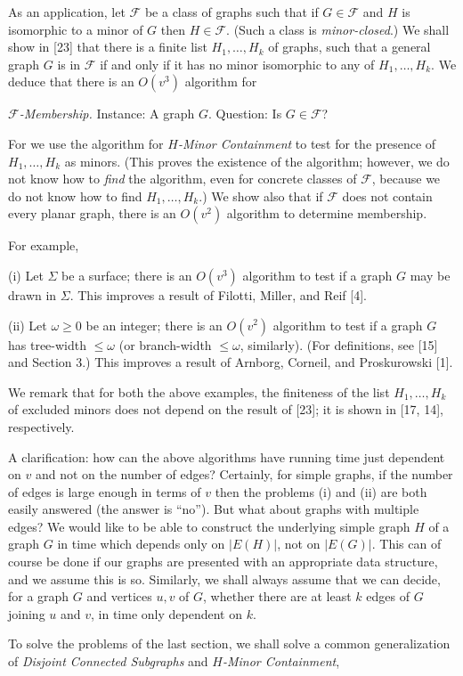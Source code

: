 As an application, let $\mathscr{F}$ be a class of graphs such that if $G \in \mathscr{F}$ and $H$ is isomorphic to a minor of $G$ then $H \in \mathscr{F}$. (Such a class is \textit{minor-closed}.) We shall show in [23] that there is a finite list $H_1, \dots, H_k$ of graphs, such that a general graph $G$ is in $\mathscr{F}$ if and only if it has no minor isomorphic to any of $H_1, \dots, H_k$. We deduce that there is an $O(v^3)$ algorithm for

\textit{$\mathscr{F}$-Membership.} Instance: A graph $G$. Question: Is $G \in \mathscr{F}$?

For we use the algorithm for \textit{$H$-Minor Containment} to test for the presence of $H_1, \dots, H_k$ as minors. (This proves the existence of the algorithm; however, we do not know how to \textit{find} the algorithm, even for concrete classes of $\mathscr{F}$, because we do not know how to find $H_1, \dots, H_k$.) We show also that if $\mathscr{F}$ does not contain every planar graph, there is an $O(v^2)$ algorithm to determine membership.

For example,

\hspace*{12pt}(i) Let $\Sigma$ be a surface; there is an $O(v^3)$ algorithm to test if a graph $G$ may be drawn in $\Sigma$. This improves a result of Filotti, Miller, and Reif [4].

\hspace*{12pt}(ii) Let $\omega \ge 0$ be an integer; there is an $O(v^2)$ algorithm to test if a graph $G$ has tree-width $\le \omega$ (or branch-width $\le \omega$, similarly). (For definitions, see [15] and Section 3.) This improves a result of Arnborg, Corneil, and Proskurowski [1].

We remark that for both the above examples, the finiteness of the list $H_1, \dots, H_k$ of excluded minors does not depend on the result of [23]; it is shown in [17, 14], respectively.

A clarification: how can the above algorithms have running time just dependent on $v$ and not on the number of edges? Certainly, for simple graphs, if the number of edges is large enough in terms of $v$ then the problems (i) and (ii) are both easily answered (the answer is ``no''). But what about graphs with multiple edges? We would like to be able to construct the underlying simple graph $H$ of a graph $G$ in time which depends only on $|E(H)|$, not on $|E(G)|$. This can of course be done if our graphs are presented with an appropriate data structure, and we assume this is so. Similarly, we shall always assume that we can decide, for a graph $G$ and vertices $u, v$ of $G$, whether there are at least $k$ edges of $G$ joining $u$ and $v$, in time only dependent on $k$.


To solve the problems of the last section, we shall solve a common generalization of \textit{Disjoint Connected Subgraphs} and \textit{$H$-Minor Containment},
